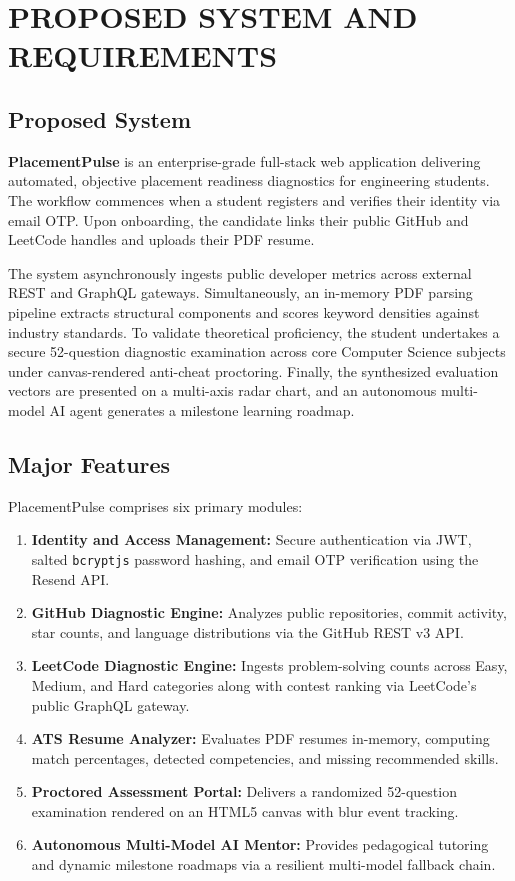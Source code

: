 \documentclass[12pt,a4paper]{report}
\begin{document}
\chapter{PROPOSED SYSTEM AND REQUIREMENTS}

\section{Proposed System}
\textbf{PlacementPulse} is an enterprise-grade full-stack web application delivering automated, objective placement readiness diagnostics for engineering students. The workflow commences when a student registers and verifies their identity via email OTP. Upon onboarding, the candidate links their public GitHub and LeetCode handles and uploads their PDF resume. 

The system asynchronously ingests public developer metrics across external REST and GraphQL gateways. Simultaneously, an in-memory PDF parsing pipeline extracts structural components and scores keyword densities against industry standards. To validate theoretical proficiency, the student undertakes a secure 52-question diagnostic examination across core Computer Science subjects under canvas-rendered anti-cheat proctoring. Finally, the synthesized evaluation vectors are presented on a multi-axis radar chart, and an autonomous multi-model AI agent generates a milestone learning roadmap.

\section{Major Features}
PlacementPulse comprises six primary modules:
\begin{enumerate}
    \item \textbf{Identity and Access Management:} Secure authentication via JWT, salted \texttt{bcryptjs} password hashing, and email OTP verification using the Resend API.
    \item \textbf{GitHub Diagnostic Engine:} Analyzes public repositories, commit activity, star counts, and language distributions via the GitHub REST v3 API.
    \item \textbf{LeetCode Diagnostic Engine:} Ingests problem-solving counts across Easy, Medium, and Hard categories along with contest ranking via LeetCode's public GraphQL gateway.
    \item \textbf{ATS Resume Analyzer:} Evaluates PDF resumes in-memory, computing match percentages, detected competencies, and missing recommended skills.
    \item \textbf{Proctored Assessment Portal:} Delivers a randomized 52-question examination rendered on an HTML5 canvas with blur event tracking.
    \item \textbf{Autonomous Multi-Model AI Mentor:} Provides pedagogical tutoring and dynamic milestone roadmaps via a resilient multi-model fallback chain.
\end{enumerate}
\end{document}

